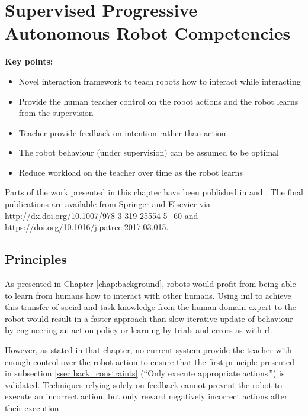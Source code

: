 \chapter{Supervised Progressive Autonomous Robot Competencies}\label{chap:sparc}

\begin{framed}
	\textbf{Key points:}
	
	\begin{itemize}
		\item Novel interaction framework to teach robots how to interact while interacting
		\item Provide the human teacher control on the robot actions and the robot learns from the supervision
		\item Teacher provide feedback on intention rather than action
		\item The robot behaviour (under supervision) can be assumed to be optimal
		\item Reduce workload on the teacher over time as the robot learns
	\end{itemize}
\end{framed}

Parts of the work presented in this chapter have been published in \cite{senft2015sparc} and \cite{senft2017supervised}. The final publications are available from Springer and Elsevier via \url{http://dx.doi.org/10.1007/978-3-319-25554-5_60} and \url{https://doi.org/10.1016/j.patrec.2017.03.015}.

\newpage

\section{Principles}

As presented in Chapter \ref{chap:background}, robots would profit from being able to learn from humans how to interact with other humans. Using \gls{iml} to achieve this transfer of social and task knowledge from the human domain-expert to the robot would result in a faster approach than slow iterative update of behaviour by engineering an action policy or learning by trials and errors as with \gls{rl}.

However, as stated in that chapter, no current system provide the teacher with enough control over the robot action to ensure that the first principle presented in subsection \ref{ssec:back_constraints} (``Only execute appropriate actions.'') is validated. Techniques relying solely on feedback cannot prevent the robot to execute an incorrect action, but only reward negatively incorrect actions after their execution \citep{senft2017supervised}


